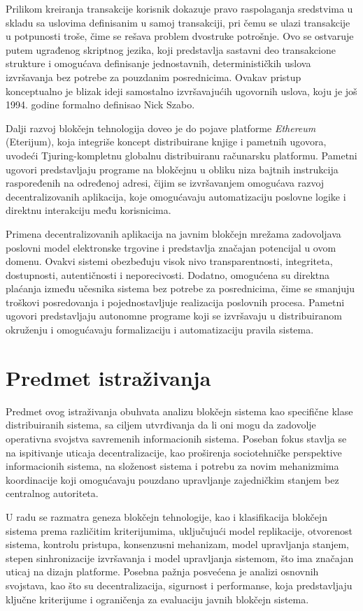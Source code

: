Prilikom kreiranja transakcije korisnik dokazuje pravo raspolaganja sredstvima u skladu sa uslovima definisanim u samoj transakciji, pri čemu se ulazi transakcije u potpunosti troše, čime se rešava problem dvostruke potrošnje. Ovo se ostvaruje putem ugrađenog skriptnog jezika, koji predstavlja sastavni deo transakcione strukture i omogućava definisanje jednostavnih, determinističkih uslova izvršavanja bez potrebe za pouzdanim posrednicima. Ovakav pristup konceptualno je blizak ideji samostalno izvršavajućih ugovornih uslova, koju je još 1994. godine formalno definisao Nick Szabo.

Dalji razvoj blokčejn tehnologija doveo je do pojave platforme \textit{Ethereum} (Eterijum), koja integriše koncept distribuirane knjige i pametnih ugovora, uvodeći Tjuring-kompletnu globalnu distribuiranu računarsku platformu. Pametni ugovori predstavljaju programe na blokčejnu u obliku niza bajtnih instrukcija raspoređenih na određenoj adresi, čijim se izvršavanjem omogućava razvoj decentralizovanih aplikacija, koje omogućavaju automatizaciju poslovne logike i direktnu interakciju među korisnicima.

Primena decentralizovanih aplikacija na javnim blokčejn mrežama zadovoljava poslovni model elektronske trgovine i predstavlja značajan potencijal u ovom domenu. Ovakvi sistemi obezbeđuju visok nivo transparentnosti, integriteta, dostupnosti, autentičnosti i neporecivosti. Dodatno, omogućena su direktna plaćanja između učesnika sistema bez potrebe za posrednicima, čime se smanjuju troškovi posredovanja i pojednostavljuje realizacija poslovnih procesa. Pametni ugovori predstavljaju autonomne programe koji se izvršavaju u distribuiranom okruženju i omogućavaju formalizaciju i automatizaciju pravila sistema.

\section{Predmet istraživanja}
Predmet ovog istraživanja obuhvata analizu blokčejn sistema kao specifične klase distribuiranih sistema, sa ciljem utvrđivanja da li oni mogu da zadovolje operativna svojstva savremenih informacionih sistema. Poseban fokus stavlja se na ispitivanje uticaja decentralizacije, kao proširenja sociotehničke perspektive informacionih sistema, na složenost sistema i potrebu za novim mehanizmima koordinacije koji omogućavaju pouzdano upravljanje zajedničkim stanjem bez centralnog autoriteta.

U radu se razmatra geneza blokčejn tehnologije, kao i klasifikacija blokčejn sistema prema različitim kriterijumima, uključujući model replikacije, otvorenost sistema, kontrolu pristupa, konsenzusni mehanizam, model upravljanja stanjem, stepen sinhronizacije izvršavanja i model upravljanja sistemom, što ima značajan uticaj na dizajn platforme. Posebna pažnja posvećena je analizi osnovnih svojstava, kao što su decentralizacija, sigurnost i performanse, koja predstavljaju ključne kriterijume i ograničenja za evaluaciju javnih blokčejn sistema.

